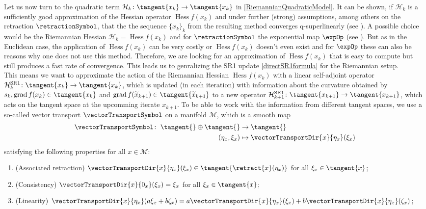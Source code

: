 Let us now turn to the quadratic term $\mathcal{H}_k \colon \tangent{x_k} \to \tangent{x_k}$ in \cref{RiemannianQuadraticModel}. It can be shown, if $\mathcal{H}_k$ is a sufficiently good approximation of the Hessian operator $\operatorname{Hess} f(x_k)$ and under further (strong) assumptions, among others on the retraction $\retractionSymbol$, that the the sequence $\{ x_k \}_k$ from the resulting method converges q-superlinearly (see \cite[Theorem~7.4.11]{AbsilMahonySepulchre:2008}). A possible choice would be the Riemannian Hessian $\mathcal{H}_k = \operatorname{Hess} f(x_k)$ and for $\retractionSymbol$ the exponential map $\expOp$ (see \cite[p.~102]{AbsilMahonySepulchre:2008}). But as in the Euclidean case, the application of $\operatorname{Hess} f(x_k)$ can be very costly or $\operatorname{Hess} f(x_k)$ doesn't even exist and for $\expOp$ these can also be reasons why one does not use this method. Therefore, we are looking for an approximation of $\operatorname{Hess} f(x_k)$ that is easy to compute but still produces a fast rate of convergence. This leads us to genralizing the SR1 update \cref{directSR1formula} for the Riemannian setup. \\
This means we want to approximate the action of the Riemannian Hessian $\operatorname{Hess} f(x_k)$ with a linear self-adjoint operator $\mathcal{H}^\mathrm{SR1}_k \colon \tangent{x_k} \to \tangent{x_k}$, which is updated (in each iteration) with information about the curvature obtained by $s_k, \operatorname{grad} f(x_k) \in \tangent{x_k}$ and $\operatorname{grad} f(\widetilde{x}_{k+1}) \in \tangent{\widetilde{x}_{k+1}}$ to a new operator $\mathcal{H}^\mathrm{SR1}_{k+1} \colon \tangent{x_{k+1}} \to \tangent{x_{k+1}}$, which acts on the tangent space at the upcomming iterate $x_{k+1}$. To be able to work with the information from different tangent spaces, we use a so-called vector transport $\vectorTransportSymbol$ on a manifold $\mathcal{M}$, which is a smooth map 
\begin{align*}
    \vectorTransportSymbol \colon \; \tangent{} \oplus \tangent{} & \to \tangent{} \\
    (\eta_x, \xi_x) & \mapsto \vectorTransportDir{x}{\eta_x}(\xi_x)
\end{align*}      
satisfying the following properties for all $x \in \mathcal{M}$:
\begin{enumerate}
    \item (Associated retraction) $\vectorTransportDir{x}{\eta_x}(\xi_x) \in \tangent{\retract{x}(\eta_x)}$ for all $\xi_x \in \tangent{x}$;
    \item (Consistency) $\vectorTransportDir{x}{0_x}(\xi_x) = \xi_x$ for all $\xi_x \in \tangent{x}$;
    \item (Linearity) $\vectorTransportDir{x}{\eta_x}(a \xi_x + b \zeta_x) = a \vectorTransportDir{x}{\eta_x}(\xi_x) + b \vectorTransportDir{x}{\eta_x}(\zeta_x)$;
\end{enumerate}
